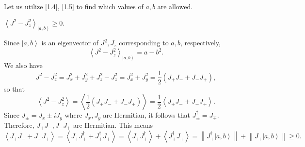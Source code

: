 \documentclass[phys334]{subfiles}
\begin{document}
    \np Let us utilize [1.4], [1.5] to find which values of $a,b$ are allowed. 

    \begin{claim}
        $\left< J^{2}-J_z^{2} \right>_{\left| a,b \right\rangle}\geq 0$. 

        Since $\left| a,b \right\rangle$ is an eigenvector of $J^{2},J_z$ corresponding to $a,b$, respectively,
        \begin{equation*}
            \left< J^{2}-J_z^{2} \right>_{\left| a,b \right\rangle} = a-b^{2}. 
        \end{equation*}
        We also have
        \begin{equation*}
            J^{2}-J_z^{2} = J_x^{2}+J_y^{2}+J_z^{2}-J_z^{2} = J_x^{2}+J_y^{2} = \frac{1}{2} \left( J_+J_-+J_-J_+ \right),
        \end{equation*}
        so that
        \begin{equation*}
            \left< J^{2}-J_z^{2} \right> = \left< \frac{1}{2}\left( J_+J_-+J_-J_+ \right) \right> = \frac{1}{2} \left< J_+J_-+J_-J_+ \right>. 
        \end{equation*}
        Since $J_{\pm} = J_x\pm iJ_y$ where $J_x,J_y$ are Hermitian, it follows that $J_{\pm}^{\dagger} = J_{\mp}$. Therefore, $J_+J_-,J_-J_+$ are Hermitian. This means
        \begin{equation*}
            \left< J_+J_-+J_-J_+ \right> = \left< J_+J_+^{\dagger}+J_+^{\dagger}J_+ \right> = \left< J_+J_+^{\dagger} \right> + \left< J_+^{\dagger}J_+ \right> = \left\lVert J_+^{\dagger}\left| a,b \right\rangle\right\rVert + \left\lVert J_+\left| a,b \right\rangle\right\rVert \geq 0.
        \end{equation*}
    \end{claim}
\end{document}
